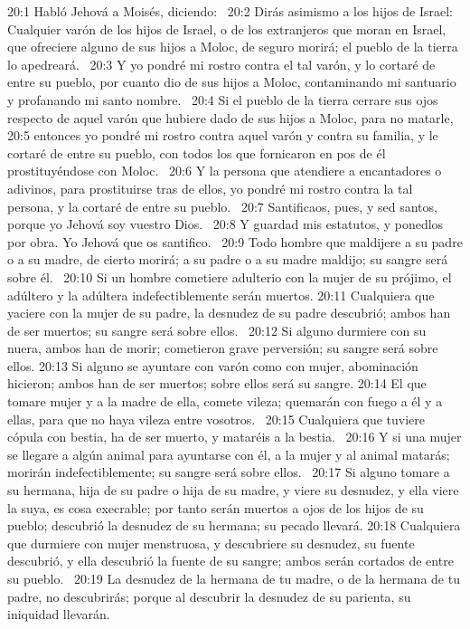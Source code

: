 20:1 Habló Jehová a Moisés, diciendo:  
20:2 Dirás asimismo a los hijos de Israel: Cualquier varón de los hijos de Israel, o de los extranjeros que moran en Israel, que ofreciere alguno de sus hijos a Moloc, de seguro morirá; el pueblo de la tierra lo apedreará.  
20:3 Y yo pondré mi rostro contra el tal varón, y lo cortaré de entre su pueblo, por cuanto dio de sus hijos a Moloc, contaminando mi santuario y profanando mi santo nombre.  
20:4 Si el pueblo de la tierra cerrare sus ojos respecto de aquel varón que hubiere dado de sus hijos a Moloc, para no matarle,  
20:5 entonces yo pondré mi rostro contra aquel varón y contra su familia, y le cortaré de entre su pueblo, con todos los que fornicaron en pos de él prostituyéndose con Moloc.  
20:6 Y la persona que atendiere a encantadores o adivinos, para prostituirse tras de ellos, yo pondré mi rostro contra la tal persona, y la cortaré de entre su pueblo.  
20:7 Santificaos, pues, y sed santos, porque yo Jehová soy vuestro Dios.  
20:8 Y guardad mis estatutos, y ponedlos por obra. Yo Jehová que os santifico.  
20:9 Todo hombre que maldijere a su padre o a su madre, de cierto morirá; a su padre o a su madre maldijo; su sangre será sobre él.  
20:10 Si un hombre cometiere adulterio con la mujer de su prójimo, el adúltero y la adúltera indefectiblemente serán muertos. 
20:11 Cualquiera que yaciere con la mujer de su padre, la desnudez de su padre descubrió; ambos han de ser muertos; su sangre será sobre ellos.  
20:12 Si alguno durmiere con su nuera, ambos han de morir; cometieron grave perversión; su sangre será sobre ellos. 
20:13 Si alguno se ayuntare con varón como con mujer, abominación hicieron; ambos han de ser muertos; sobre ellos será su sangre. 
20:14 El que tomare mujer y a la madre de ella, comete vileza; quemarán con fuego a él y a ellas, para que no haya vileza entre vosotros.  
20:15 Cualquiera que tuviere cópula con bestia, ha de ser muerto, y mataréis a la bestia.  
20:16 Y si una mujer se llegare a algún animal para ayuntarse con él, a la mujer y al animal matarás; morirán indefectiblemente; su sangre será sobre ellos.  
20:17 Si alguno tomare a su hermana, hija de su padre o hija de su madre, y viere su desnudez, y ella viere la suya, es cosa execrable; por tanto serán muertos a ojos de los hijos de su pueblo; descubrió la desnudez de su hermana; su pecado llevará. 
20:18 Cualquiera que durmiere con mujer menstruosa, y descubriere su desnudez, su fuente descubrió, y ella descubrió la fuente de su sangre; ambos serán cortados de entre su pueblo.  
20:19 La desnudez de la hermana de tu madre, o de la hermana de tu padre, no descubrirás; porque al descubrir la desnudez de su parienta, su iniquidad llevarán.  
